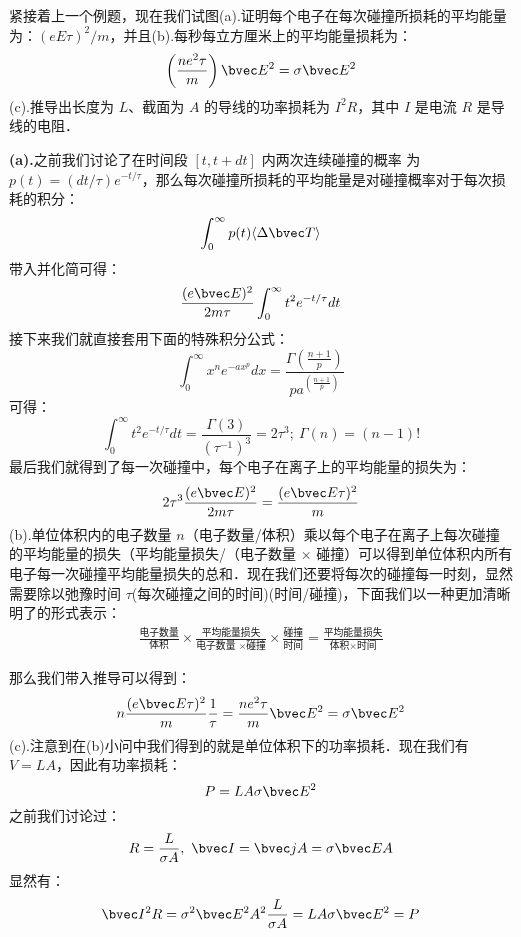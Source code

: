 \begin{exercise}{}
紧接着上一个例题，现在我们试图(a).证明每个电子在每次碰撞所损耗的平均能量为：$(eE\tau)^2/m$，并且(b).每秒每立方厘米上的平均能量损耗为：
\begin{equation}
\left(\frac{ne^2\tau}{m}\right)\bvec E^2=\sigma \bvec E^2
\end{equation}
(c).推导出长度为 $L$、截面为 $A$ 的导线的功率损耗为 $I^2R$，其中 $I$ 是电流 $R$ 是导线的电阻．

\textbf{(a).}之前我们讨论了在时间段 $[t, t + dt]$ 内两次连续碰撞的概率
为 $p(t)=(dt/\tau)e^{- t/\tau}$，那么每次碰撞所损耗的平均能量是对碰撞概率对于每次损耗的积分：
\begin{equation}
\int_0^\infty p(t) \langle\Delta\bvec T\rangle
\end{equation}
带入并化简可得：
\begin{equation}
\frac{(e\bvec E)^2}{2m\tau}\int_0^\infty t^2 e^{- t/\tau}dt
\end{equation}
接下来我们就直接套用下面的特殊积分公式：
\begin{equation}
\int_0^\infty x^n e^{-ax^p}dx = \frac{\Gamma\left(\frac{n+1}{p}\right)}{pa^{\left(\frac{n+1}{p}\right)}}
\end{equation}
可得：
\begin{equation}
\int_0^\infty t^2 e^{- t/\tau}dt=\frac{\Gamma(3)}{(\tau^{-1})^3}=2\tau^3;\ \Gamma(n)=(n-1)!
\end{equation}
最后我们就得到了每一次碰撞中，每个电子在离子上的平均能量的损失为：
\begin{equation}
2\tau^3\frac{(e\bvec E)^2}{2m\tau}=\frac{(e\bvec E\tau)^2}{m}
\end{equation}
(b).单位体积内的电子数量 $n$（电子数量/体积）乘以每个电子在离子上每次碰撞的平均能量的损失（平均能量损失/（电子数量 $\times$ 碰撞）可以得到单位体积内所有电子每一次碰撞平均能量损失的总和．现在我们还要将每次的碰撞每一时刻，显然需要除以弛豫时间 $\tau$(每次碰撞之间的时间)(时间/碰撞)，下面我们以一种更加清晰明了的形式表示：
\begin{align}
\frac{\mbox{电子数量}}{\mbox{体积}}\times \frac{\mbox{平均能量损失}}{\mbox{电子数量 }\times \mbox{碰撞}}\times\frac{\mbox{碰撞}}{\mbox{时间}}=\frac{\mbox{平均能量损失}}{\mbox{体积}\times \mbox{时间}}
\end{align}

那么我们带入推导可以得到：
\begin{equation}
n \frac{(e\bvec E\tau)^2}{m} \frac{1}{\tau} = \frac{ne^2\tau}{m}\bvec E^2 = \sigma \bvec E^2
\end{equation}
(c).注意到在(b)小问中我们得到的就是单位体积下的功率损耗．现在我们有 $V=LA$，因此有功率损耗：
\begin{equation}
P = LA\sigma \bvec E^2
\end{equation}
之前我们讨论过：
\begin{equation}
R = \frac{L}{\sigma A},\ \bvec I = \bvec j A=\sigma\bvec E A
\end{equation}
显然有：
\begin{equation}
\bvec I^2 R=\sigma^2\bvec E^2 A^2 \frac{L}{\sigma A} = LA\sigma \bvec E^2 = P
\end{equation}
\end{exercise}




